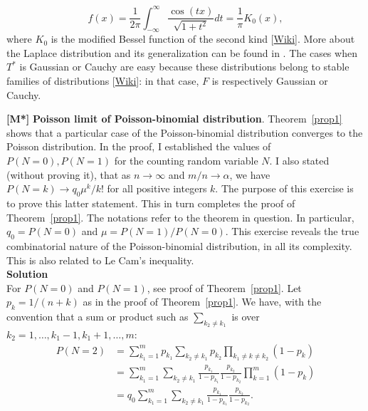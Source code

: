 \documentclass[10pt]{article}
\begin{document}
\begin{Exercise}
$$f(x)=\frac{1}{2\pi}\int_{-\infty}^\infty \frac{\cos(tx)}{\sqrt{1+t^2}} dt = \frac{1}{\pi}K_0(x),$$
where $K_0$ is the modified \textcolor{index}{Bessel function} of the second kind 
[\href{https://mathworld.wolfram.com/ModifiedBesselFunctionoftheSecondKind.html}{Wiki}]. 
More about the Laplace distribution and its generalization can be found in \cite{laplace}. The cases when $T^*$ is Gaussian or Cauchy are easy because these distributions belong to \textcolor{index}{stable families of distributions} 
[\href{https://en.wikipedia.org/wiki/Stable_distribution}{Wiki}]: 
in that case, $F$ is respectively Gaussian or Cauchy.
\end{Exercise}

\begin{Exercise}\label{exercise14}{\bf [M*]} 
{\bf Poisson limit of Poisson-binomial distribution}.  Theorem~\ref{prop1} shows that a particular case of the Poisson-binomial distribution converges to the Poisson distribution. In the proof, I established the values of $P(N=0), P(N=1)$ for the counting random variable $N$. I also stated (without proving it), that as $n\rightarrow\infty$ and $m/n\rightarrow\alpha$, we have $P(N=k)\rightarrow q_0\mu^k/k!$ for all positive integers $k$.  The purpose of this exercise is to prove this latter statement. 
This in turn completes the proof of Theorem~\ref{prop1}. The notations refer to the theorem in question.  In particular, $q_0=P(N=0)$ and $\mu=P(N=1)/P(N=0)$.
This exercise reveals  the true combinatorial nature of the Poisson-binomial distribution, in all its complexity. This is also related to \textcolor{index}{Le Cam's inequality}. \vspace{1ex}   \\
{\bf Solution} \vspace{1ex}   \\
For $P(N=0)$ and $P(N=1)$, see proof of Theorem~\ref{prop1}. Let $p_k=1/(n+k)$ as in the proof of Theorem~\ref{prop1}. We have, with the convention that a sum or product such as
$\sum_{k_2\neq k_1}$ is over $k_2=1,\dots,k_1-1,k_1+1,\dots,m$:
\begin{align}
P(N=2)& =\sum_{k_1=1}^m p_{k_1} \sum_{k_2\neq k_1} p_{k_2}\prod_{k_1 \neq k\neq k_2} (1-p_k) \nonumber \\
&= \sum_{k_1=1}^m \sum_{k_2\neq k_1} \frac{p_{k_1}}{1-p_{k_1}}\frac{p_{k_2}}{1-p_{k_2}}\prod_{k=1}^m (1-p_k)\nonumber \\
&= q_0 \sum_{k_1=1}^m \sum_{k_2\neq k_1} \frac{p_{k_1}}{1-p_{k_1}}\frac{p_{k_2}}{1-p_{k_2}}. \label{dds}

\end{align}
\end{Exercise}
\end{document}
